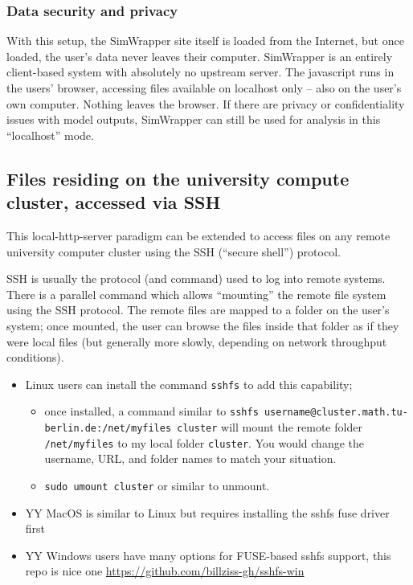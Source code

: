\hypertarget{data-security-and-privacy}{%
\subsubsection{Data security and
privacy}\label{data-security-and-privacy}}

With this setup, the SimWrapper site itself is loaded from the Internet,
but once loaded, the user's data never leaves their computer. SimWrapper
is an entirely client-based system with absolutely no upstream server.
The javascript runs in the users' browser, accessing files available on
localhost only -- also on the user's own computer. Nothing leaves the
browser. If there are privacy or confidentiality issues with model
outputs, SimWrapper can still be used for analysis in this ``localhost''
mode.


\hypertarget{files-residing-on-the-university-compute-cluster-accessed-via-ssh}{%
\subsection{Files residing on the university compute cluster, accessed
via
SSH}\label{files-residing-on-the-university-compute-cluster-accessed-via-ssh}}

This local-http-server paradigm can be extended to access files on any
remote university computer cluster using the SSH (``secure shell'')
protocol.

SSH is usually the protocol (and command) used to log into remote
systems. There is a parallel command which allows ``mounting'' the
remote file system using the SSH protocol. The remote files are mapped
to a folder on the user's system; once mounted, the user can browse the
files inside that folder as if they were local files (but generally more
slowly, depending on network throughput conditions).

\begin{itemize}
\item
  Linux users can install the command \texttt{sshfs} to add this
  capability;

  \begin{itemize}
  \item
    once installed, a command similar to
    \texttt{sshfs\ username@cluster.math.tu-berlin.de:/net/myfiles\ cluster}
    will mount the remote folder \texttt{/net/myfiles} to my local
    folder \texttt{cluster}. You would change the username, URL, and
    folder names to match your situation.
  \item
    \texttt{sudo\ umount\ cluster} or similar to unmount.
  \end{itemize}
\item
  YY MacOS is similar to Linux but requires installing the sshfs fuse
  driver first
\item
  YY Windows users have many options for FUSE-based sshfs support, this
  repo is nice one \url{https://github.com/billziss-gh/sshfs-win}
\end{itemize}

